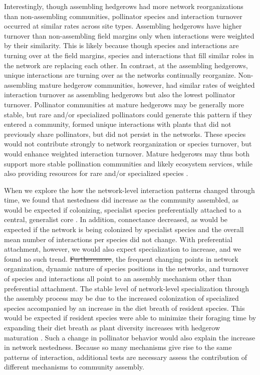 \documentclass[12pt]{article}
\providecommand{\DIFaddtex}[1]{{\protect\color{blue}\uwave{#1}}} %
\providecommand{\DIFdeltex}[1]{{\protect\color{red}\sout{#1}}}                      %
\providecommand{\DIFaddbegin}{} %
\providecommand{\DIFaddend}{} %
\providecommand{\DIFdelbegin}{} %
\providecommand{\DIFdelend}{} %
\providecommand{\DIFadd}[1]{\texorpdfstring{\DIFaddtex{#1}}{#1}} %
\providecommand{\DIFdel}[1]{\texorpdfstring{\DIFdeltex{#1}}{}} %
\begin{document}
Interestingly, though assembling hedgerows had more network
reorganizations than non-assembling communities, pollinator species
and interaction turnover occurred at similar rates across site types.
Assembling hedgerows have higher turnover than non-assembling field
margins only when interactions were weighted by their similarity. This
is likely because though species and interactions are turning over at
the field margins, species and interactions that fill similar roles in
the network are replacing each other. In contrast, at the assembling
hedgerows, unique interactions are turning over as the networks
continually reorganize. Non-assembling mature hedgerow communities,
however, had similar rates of weighted interaction turnover as
assembling hedgerows but also the lowest pollinator
turnover. Pollinator communities at mature hedgerows may be generally
more stable, but rare and/or specialized pollinators could generate
this pattern if they entered a community, formed unique interactions
with plants that did not previously share pollinators, but did not
persist in the networks. These species would not contribute strongly
to network reorganization or species turnover, but would enhance
weighted interaction turnover. Mature hedgerows may thus both support
more stable pollination communities and likely ecosystem services,
while also providing resources for rare and/or specialized species
\citep{kremen-2015-602, mgonigle-2015-x}.

When we explore the how the network-level interaction patterns changed
through time, we found that nestedness did increase as the community
assembled, as would be expected if colonizing, specialist species
preferentially attached to a central, generalist core
\citep{albrecht2010plant}. In addition, connectance decreased, as
would be expected if the network is being colonized by specialist
species and the overall mean number of interactions per species did
not change. With preferential attachment, however, we would also
expect specialization to increase, and we found no such
trend. \DIFdelbegin \DIFdel{Furtheremore}\DIFdelend \DIFaddbegin \DIFadd{Furthermore}\DIFaddend , the frequent changing points in network
organization, dynamic nature of species positions in the networks, and
turnover of species and interactions all point to an assembly
mechanism other than preferential attachment.  The stable level of
network-level specialization through the assembly process may be due
to the increased colonization of specialized species
\citep{mgonigle-2015-x} accompanied by an increase in the diet breath
of resident species. This would be expected if resident species were
able to minimize their foraging time by expanding their diet breath as
plant diversity increases with hedgerow maturation \citep{Waser1996,
  pyke1984optimal, Bluthgen2007, albrecht2010plant}. Such a change in
pollinator behavior would also explain the increase in network
nestedness. Because so many mechanisms give rise to the same patterns
of interaction, additional tests are necessary \DIFaddbegin \DIFadd{to }\DIFaddend assess the contribution
of different mechanisms to community assembly.
\end{document}

